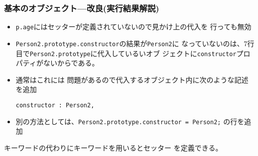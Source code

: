\begin{frame}[containsverbatim]
 \frametitle{基本のオブジェクト---改良(実行結果解説)}
\begin{itemize}
 \item \texttt{p.age}にはセッターが定義されていないので見かけ上の代入を
       行っても無効
 \item \texttt{Person2.prototype.constructor}の結果が\texttt{Person2}に
なっていないのは、7行目で\texttt{Person2.prototype}に代入しているいオブ
       ジェクトに\texttt{constructor}プロパティがないからである。
 \item  通常はこれには
問題があるので代入するオブジェクト内に次のような記述を追加
\begin{Verbatim}
constructor : Person2,
\end{Verbatim}
 \item 別の方法としては、\texttt{Person2.prototype.constructor = Person2;}
の行を追加
\end{itemize}

キーワードの代わりにキーワードを用いるとセッター
を定義できる。
\end{frame}
